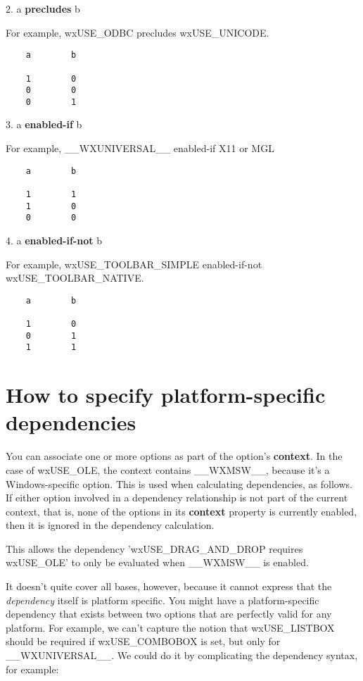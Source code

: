 2. a {\bf precludes} b

For example, wxUSE_ODBC precludes wxUSE_UNICODE.

\begin{verbatim}
    a        b

    1        0
    0        0
    0        1
\end{verbatim}


3. a {\bf enabled-if} b

For example, __WXUNIVERSAL__ enabled-if X11 or MGL

\begin{verbatim}
    a        b

    1        1
    1        0
    0        0
\end{verbatim}

4. a {\bf enabled-if-not} b

For example, wxUSE_TOOLBAR_SIMPLE enabled-if-not wxUSE_TOOLBAR_NATIVE.

\begin{verbatim}
    a        b

    1        0
    0        1
    1        1
\end{verbatim}

\section{How to specify platform-specific dependencies}\label{platformdependencies}

You can associate one or more options as part of the
option's {\bf context}. In the case of wxUSE_OLE,
the context contains __WXMSW__, because it's a Windows-specific
option. This is used when calculating dependencies, as
follows. If either option involved in a dependency
relationship is not part of the current context, that
is, none of the options in its {\bf context} property is currently
enabled, then it is ignored in the dependency calculation.

This allows the dependency 'wxUSE_DRAG_AND_DROP requires wxUSE_OLE'
to only be evaluated when __WXMSW__ is enabled.

It doesn't quite cover all bases, however, because
it cannot express that the {\it dependency} itself
is platform specific. You might have a platform-specific
dependency that exists between two options that are
perfectly valid for any platform. For example, we
can't capture the notion that wxUSE_LISTBOX
should be required if wxUSE_COMBOBOX is set,
but only for __WXUNIVERSAL__. We could do it
by complicating the dependency syntax, for example:

